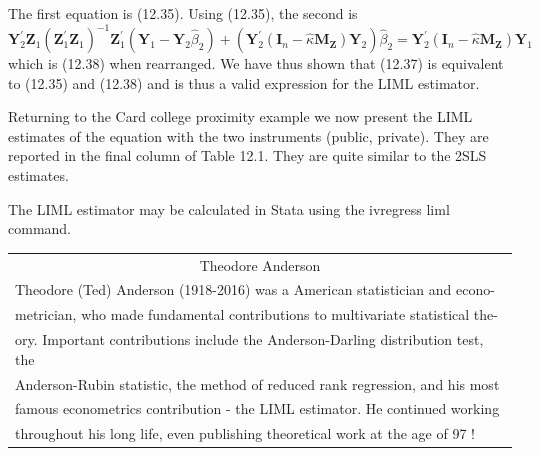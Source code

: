 \documentclass[10pt]{article}
\begin{document}
The first equation is (12.35). Using (12.35), the second is
$$
\boldsymbol{Y}_{2}^{\prime} \boldsymbol{Z}_{1}\left(\boldsymbol{Z}_{1}^{\prime} \boldsymbol{Z}_{1}\right)^{-1} \boldsymbol{Z}_{1}^{\prime}\left(\boldsymbol{Y}_{1}-\boldsymbol{Y}_{2} \widehat{\beta}_{2}\right)+\left(\boldsymbol{Y}_{2}^{\prime}\left(\boldsymbol{I}_{n}-\widehat{\kappa} \boldsymbol{M}_{\boldsymbol{Z}}\right) \boldsymbol{Y}_{2}\right) \widehat{\beta}_{2}=\boldsymbol{Y}_{2}^{\prime}\left(\boldsymbol{I}_{n}-\widehat{\kappa} \boldsymbol{M}_{\boldsymbol{Z}}\right) \boldsymbol{Y}_{1}
$$
which is (12.38) when rearranged. We have thus shown that (12.37) is equivalent to (12.35) and (12.38) and is thus a valid expression for the LIML estimator.

Returning to the Card college proximity example we now present the LIML estimates of the equation with the two instruments (public, private). They are reported in the final column of Table 12.1. They are quite similar to the 2SLS estimates.

The LIML estimator may be calculated in Stata using the ivregress liml command.

\begin{tabular}{|l|}
\hline
\multicolumn{1}{|c|}{Theodore Anderson} \\
Theodore (Ted) Anderson (1918-2016) was a American statistician and econo- \\
metrician, who made fundamental contributions to multivariate statistical the- \\
ory. Important contributions include the Anderson-Darling distribution test, the \\
Anderson-Rubin statistic, the method of reduced rank regression, and his most \\
famous econometrics contribution - the LIML estimator. He continued working \\
throughout his long life, even publishing theoretical work at the age of 97 ! \\
\end{tabular}
\end{document}
